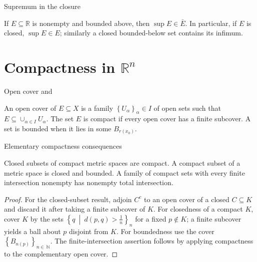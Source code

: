 \begin{lemma}{Supremum in the closure}

If \(E \subseteq \mathbb{R}\) is nonempty and bounded above, then \(\sup E \in \bar{E}\). In particular, if \(E\) is closed, \(\sup E \in E\); similarly a closed bounded-below set contains its infimum.

\end{lemma}

\section{\texorpdfstring{Compactness in \(\mathbb{R}^{n}\)}{Compactness in \textbackslash mathbb\{R\}\^{}\{n\}}}

\begin{definition}{Open cover and }

An open cover of \(E \subseteq X\) is a family \(\left\{ U_{\alpha} \right\}_{\alpha} \in I\) of open sets such that \(E \subseteq \cup_{\alpha \in I}U_{\alpha}\). The set \(E\) is compact if every open cover has a finite subcover. A set is bounded when it lies in some \(B_{r{(x_{0})}}\).

\end{definition}

\begin{theorem}{Elementary compactness consequences}

Closed subsets of compact metric spaces are compact. A compact subset of a metric space is closed and bounded. A family of compact sets with every finite intersection nonempty has nonempty total intersection.

\end{theorem}

\begin{proof}

For the closed-subset result, adjoin \(C^{c}\) to an open cover of a closed \(C \subseteq K\) and discard it after taking a finite subcover of \(K\). For closedness of a compact \(K\), cover \(K\) by the sets \(\left\{ q\  \middle| \ d\left( {p,q} \right) > \frac{1}{n} \right\}_{n}\) for a fixed \(p \notin K\); a finite subcover yields a ball about \(p\) disjoint from \(K\). For boundedness use the cover \(\left\{ B_{n{(p)}} \right\}_{n \in \ \mathbb{N}}\). The finite-intersection assertion follows by applying compactness to the complementary open cover.

\end{proof}

